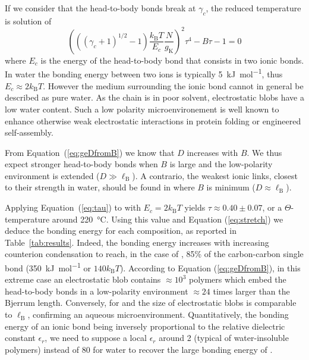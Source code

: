 \documentclass[twoside,twocolumn,9pt]{article}
\begin{document}
If we consider that the head-to-body bonds break at $\gamma_c$, the reduced temperature is solution of
\begin{equation}
\left(\left((\gamma_c +1)^{1/2} -1\right)\frac{k_\mathrm{B}T}{E_c}\frac{N}{g_\mathrm{K}}\right)^2 \tau^4 - B\tau -1 = 0
\label{eq:tau}
\end{equation}
where $E_c$ is the energy of the head-to-body bond that consists in two ionic bonds. In water the bonding energy between two ions is typically \SI{5}{\kilo\joule\per\mole}\cite{Schneider1992}, thus $E_c\approx 2 k_\mathrm{B}T$. However the medium surrounding the ionic bond cannot in general be described as pure water. As the chain is in poor solvent, electrostatic blobs have a low water content. Such a low polarity microenvironement is well known to enhance otherwise weak electrostatic interactions in protein folding or engineered self-assembly\cite{Rehm2010}.

From Equation~(\ref{eq:geDfromB}) we know that $D$ increases with $B$. We thus expect stronger head-to-body bonds when $B$ is large and the low-polarity environment is extended ($D\gg\ell_\mathrm{B}$). A contrario, the weakest ionic links, closest to their strength in water, should be found in  where $B$ is minimum ($D\approx\ell_\mathrm{B}$).

Applying Equation~(\ref{eq:tau}) to  with $E_c = 2 k_\mathrm{B}T$ yields $\tau \approx 0.40\pm 0.07$, or a $\Theta$-temperature around \SI{220}{\celsius}. Using this value and Equation (\ref{eq:stretch}) we deduce the bonding energy for each composition, as reported in Table~\ref{tab:results}. Indeed, the bonding energy increases with increasing counterion condensation to reach, in the case of , 85\% of the carbon-carbon single bond (\SI{350}{\kilo\joule\per\mole} or $140 k_\mathrm{B}T$). According to Equation (\ref{eq:geDfromB}), in this extreme case an electrostatic blob contains $\approx 10^3$ polymers which embed the head-to-body bonds in a low-polarity environment $\approx 24$ times larger than the Bjerrum length. Conversely, for  and  the size of electrostatic blobs is comparable to $\ell_\mathrm{B}$, confirming an aqueous microenvironment. Quantitatively, the bonding energy of an ionic bond being inversely proportional to the relative dielectric constant $\epsilon_r$, we need to suppose a local $\epsilon_r$ around 2 (typical of water-insoluble polymers) instead of 80 for water to recover the large bonding energy of .
\end{document}
